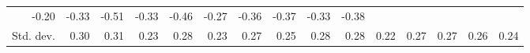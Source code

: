 \begin{tabular}{lllllllllllllll}
  \multicolumn{1}{r}{-0.20} &
  \multicolumn{1}{r}{-0.33} &
  \multicolumn{1}{r}{-0.51} &
  \multicolumn{1}{r}{-0.33} &
  \multicolumn{1}{r}{-0.46} &
  \multicolumn{1}{r}{-0.27} &
  \multicolumn{1}{r}{-0.36} &
  \multicolumn{1}{r}{-0.37} &
  \multicolumn{1}{r}{-0.33} &
  \multicolumn{1}{r}{-0.38} \\
\multicolumn{1}{l}{\hspace{2em}Std. dev.} &
  \multicolumn{1}{|r}{0.30} &
  \multicolumn{1}{r}{0.31} &
  \multicolumn{1}{r}{0.23} &
  \multicolumn{1}{r}{0.28} &
  \multicolumn{1}{r}{0.23} &
  \multicolumn{1}{r}{0.27} &
  \multicolumn{1}{r}{0.25} &
  \multicolumn{1}{r}{0.28} &
  \multicolumn{1}{r}{0.28} &
  \multicolumn{1}{r}{0.22} &
  \multicolumn{1}{r}{0.27} &
  \multicolumn{1}{r}{0.27} &
  \multicolumn{1}{r}{0.26} &
  \multicolumn{1}{r}{0.24} \\
\cline{1-15}
\end{tabular}
